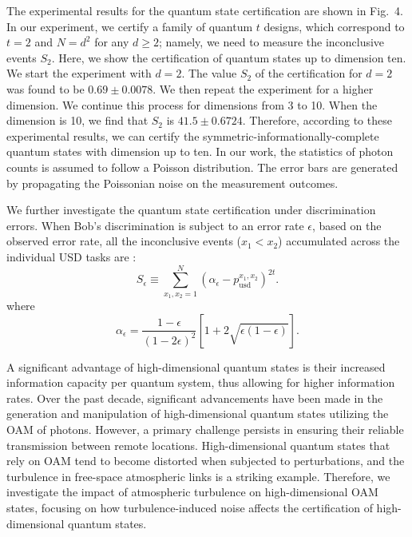 \documentclass[letterpaper,preprint,superscriptaddress,floatfix,showpacs]{revtex4}
\begin{document}
The experimental results for the quantum state certification are shown in Fig.\ 4. In our experiment, we certify a family of quantum $t$ designs, which correspond to $t=2$ and $N=d^{2}$ for any $d\geq2$; namely, we need to measure the inconclusive events $S_{2}$. Here, we show the certification of quantum states up to dimension ten. We start the experiment with $d=2$. The value $S_{2}$ of the certification for $d=2$ was found to be $0.69\pm0.0078$. We then repeat the experiment for a higher dimension. We continue this process for dimensions from 3 to 10. When the dimension is 10, we find that $S_{2}$ is $41.5\pm0.6724$. Therefore, according to these experimental results, we can certify the symmetric-informationally-complete quantum states with dimension up to ten. In our work, the statistics of photon counts is assumed to follow a Poisson distribution. The error bars are generated by propagating the Poissonian noise on the measurement outcomes.







We further investigate the quantum state certification under discrimination errors. When Bob's discrimination is subject to an error rate $\epsilon$, based on the observed error rate, all the inconclusive events ($x_{1}<x_{2}$) accumulated across the individual USD tasks are \cite{Armin2020}:
\begin{equation}
S_{\epsilon}\equiv \sum_{x_{1}, x_{2}=1}^{N}(\alpha_{\epsilon}-p^{x_{1},x_{2}}_{\mathrm{usd}})^{2t}.
\end{equation}
where
\begin{equation}
\alpha_{\epsilon} = \dfrac{1-\epsilon}{(1-2\epsilon)^{2}}[1+2\sqrt{\epsilon(1-\epsilon)}].
\end{equation}





A significant advantage of high-dimensional quantum states is their increased information capacity per quantum system, thus allowing for higher information rates. Over the past decade, significant advancements have been made in the generation and manipulation of high-dimensional quantum states utilizing the OAM of photons. However, a primary challenge persists in ensuring their reliable transmission between remote locations. High-dimensional quantum states that rely on OAM tend to become distorted when subjected to perturbations, and the turbulence in free-space atmospheric links is a striking example. Therefore, we investigate the impact of atmospheric turbulence on high-dimensional OAM states, focusing on how turbulence-induced noise affects the certification of high-dimensional quantum states.
\end{document}
